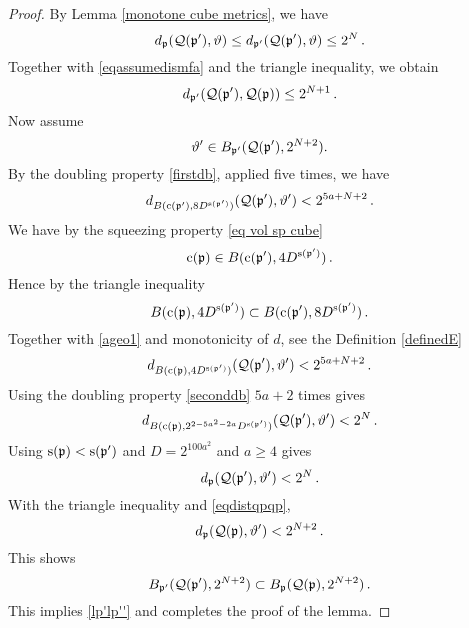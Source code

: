 {\begin{proof}
By Lemma \ref{monotone cube metrics}, we have
\begin{equation}
     d_{\mathfrak p}(\mathcal{Q}(\mathfrak p'),\vartheta)
     \le d_{\mathfrak p'}(\mathcal{Q}(\mathfrak p'),\vartheta)
     \le  2^{N} \, .
\end{equation}
Together with \eqref{eqassumedismfa} and the triangle inequality, we obtain
\begin{equation}\label{eqdistqpqp}
    d_{\mathfrak p'}(\mathcal{Q}(\mathfrak p'),\mathcal{Q}(\mathfrak p))\le 2^{N+1}  \, .
\end{equation}
Now assume
\begin{equation}
    \vartheta'\in B_{\mathfrak p'}(\mathcal{Q}(\mathfrak p'),2^{N+2}).
\end{equation}
By the doubling property \eqref{firstdb}, applied five times, we have
\begin{equation}\label{ageo1}    d_{B(\mathrm{c}(\mathfrak p'),8D^{\mathrm{s}(\mathfrak p')})}(\mathcal{Q}(\mathfrak p'),\vartheta') < 2^{5a+N+2}\, .
\end{equation}
We have by the squeezing property \eqref{eq vol sp cube}
\begin{equation}
 \mathrm{c}(\mathfrak p)\in
B(\mathrm{c}(\mathfrak p'),4D^{\mathrm{s}(\mathfrak p')})\, .
\end{equation}
Hence by the triangle inequality
\begin{equation}
 B(\mathrm{c}(\mathfrak p), 4D^{\mathrm{s}(\mathfrak p')})
 \subset
B(\mathrm{c}(\mathfrak p'),8D^{\mathrm{s}(\mathfrak p')})\, .
\end{equation}
Together with \eqref{ageo1} and   monotonicity of $d$, see the Definition \eqref{definedE}
\begin{equation}
    d_{B(\mathrm{c}(\mathfrak p),4D^{\mathrm{s}(\mathfrak p')})}(\mathcal{Q}(\mathfrak p'),\vartheta') < 2^{5a+N+2}\, .
\end{equation}
Using the doubling property \eqref{seconddb} $5a+2$ times  gives
\begin{equation}
    d_{B(\mathrm{c}(\mathfrak p),2^{2-5a^2-2a}D^{\mathrm{s}(\mathfrak p')})}(\mathcal{Q}(\mathfrak p'),\vartheta') < 2^{N}\, .
\end{equation}
Using $\mathrm{s}(\mathfrak p)<\mathrm{s}(\mathfrak p')$ and $D=2^{100a^2}$ and $a\ge 4$ gives
\begin{equation}
    d_{\mathfrak p}(\mathcal{Q}(\mathfrak p'),\vartheta') < 2^{N}\, .
\end{equation}
With the triangle inequality and \eqref{eqdistqpqp},
\begin{equation}
    d_{\mathfrak p}(\mathcal{Q}(\mathfrak p),\vartheta') < 2^{N+2}\, .
\end{equation}
This shows
\begin{equation}
B_{\mathfrak p'}(\mathcal{Q}(\mathfrak p'),2^{N+2})\subset    B_{\mathfrak p}(\mathcal{Q}(\mathfrak p),2^{N+2})\, .
\end{equation}
This implies  \eqref{lp'lp''} and completes the proof of the lemma.
\end{proof}

}
